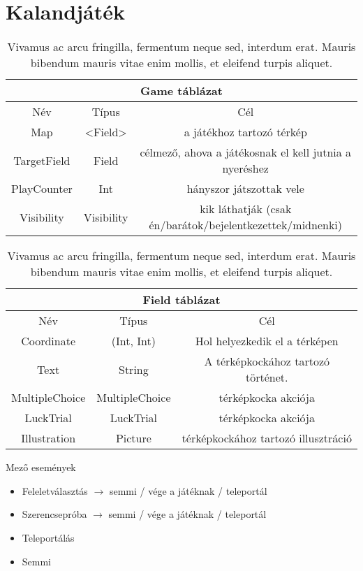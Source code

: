\section{Kalandjáték}

\begin{table}[htb]
	\centering
	\begin{tabular}{ |c|c|c| }
		\hline
		\multicolumn{3}{|c|}{Game táblázat}\\
		\hline
		Név & Típus & Cél \\
		\hline
		Map  & <Field>  & a játékhoz tartozó térkép  \\
		\hline
		TargetField & Field & célmező, ahova a játékosnak el kell jutnia a nyeréshez\\
		\hline
		PlayCounter & Int & hányszor játszottak vele\\
		\hline
		Visibility & Visibility & kik láthatják \newline (csak én/barátok/bejelentkezettek/midnenki)\\
		\hline
	\end{tabular}
	\caption[Rövid cím a táblázatjegyzékbe]{Vivamus ac arcu fringilla, fermentum neque sed, interdum erat. Mauris bibendum mauris vitae enim mollis, et eleifend turpis aliquet.}
	\label{tab:example-2}
\end{table}

\begin{table}[htb]
	\centering
	\begin{tabular}{ |c|c|c| }
		\hline
		\multicolumn{3}{|c|}{Field táblázat}\\
		\hline
		Név & Típus & Cél \\
		\hline
		Coordinate  & (Int, Int)  & Hol helyezkedik el a térképen  \\
		\hline
		Text & String & A térképkockához tartozó történet.\\
		\hline
		MultipleChoice & MultipleChoice & térképkocka akciója\\
		\hline
		LuckTrial & LuckTrial & térképkocka akciója\\
		\hline
		Illustration & Picture& térképkockához tartozó illusztráció\\
		\hline
	\end{tabular}
	\caption[Rövid cím a táblázatjegyzékbe]{Vivamus ac arcu fringilla, fermentum neque sed, interdum erat. Mauris bibendum mauris vitae enim mollis, et eleifend turpis aliquet.}
	\label{tab:example-2}
\end{table}

Mező események
\begin{itemize}
	\item Feleletválasztás $\rightarrow$ semmi / vége a játéknak / teleportál
	\item Szerencsepróba $\rightarrow$ semmi / vége a játéknak / teleportál
	\item Teleportálás
	\item Semmi
\end{itemize}